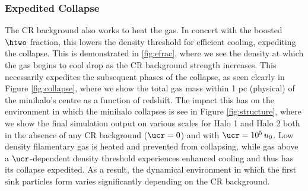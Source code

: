\subsubsection{Expedited Collapse}
The CR background also works to heat the gas.  In concert with the boosted $\htwo$ fraction, this lowers the density threshold for efficient cooling, expediting the collapse.  This is demonstrated in \ref{fig:efrac}, where we see the density at which the gas begins to cool drop as the CR background strength increases.  This necessarily expedites the subsequent phases of the collapse, as seen clearly in Figure \ref{fig:collapse}, where we show the total gas mass within 1 pc (physical) of the minihalo's centre as a function of redshift.  The impact this has on the environment in which the minihalo collapses is see in Figure \ref{fig:structure}, where we show the final simulation output on various scales for Halo 1 and Halo 2 both in the absence of any CR background ($\ucr=0$) and with $\ucr=10^5\,u_0$. Low density filamentary gas is heated and prevented from collapsing, while gas above a $\ucr$-dependent density threshold experiences enhanced cooling and thus has its collapse expedited.  As a result, the dynamical environment in which the first sink particles form varies significantly depending on the CR background.

